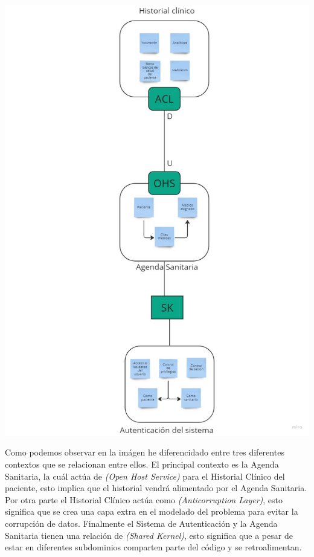 \includegraphics{contextual_map.pdf}

Como podemos observar en la imágen he diferencidado entre tres diferentes contextos que se relacionan entre ellos. 
El principal contexto es la Agenda Sanitaria, la cuál actúa de \textit{(Open Host Service)} para el Historial Clínico del paciente, 
esto implica que el historial vendrá alimentado por el Agenda Sanitaria. Por otra parte el Historial Clínico actúa como 
\textit{(Anticorruption Layer)}, esto significa que se crea una capa extra en el modelado del problema para evitar la corrupción
de datos. Finalmente el Sistema de Autenticación y la Agenda Sanitaria tienen una relación de \textit{(Shared Kernel)}, esto significa
que a pesar de estar en diferentes subdominios comparten parte del código y se retroalimentan. 